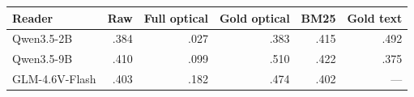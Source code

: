 \begin{tabular}{lrrrrr}
\toprule
Reader & Raw & Full optical & Gold optical & BM25 & Gold text \\
\midrule
Qwen3.5-2B & .384 & .027 & .383 & .415 & .492 \\
Qwen3.5-9B & .410 & .099 & .510 & .422 & .375 \\
GLM-4.6V-Flash & .403 & .182 & .474 & .402 & --- \\
\bottomrule
\end{tabular}
